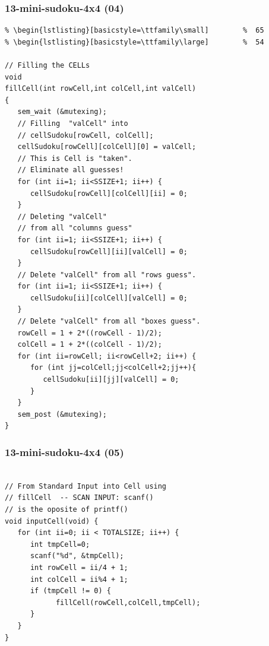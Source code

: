 \documentclass[xcolor=table, notheorems, hyperref={pdfpagelabels=false}]{beamer}
\begin{document}
\begin{frame}[fragile]
\frametitle{13-mini-sudoku-4x4 (04)}
\begin{lstlisting}[basicstyle=\ttfamily\tiny]         % 108
% \begin{lstlisting}[basicstyle=\ttfamily\footnotesize] %  72
% \begin{lstlisting}[basicstyle=\ttfamily\small]        %  65
% \begin{lstlisting}[basicstyle=\ttfamily\large]        %  54

// Filling the CELLs
void
fillCell(int rowCell,int colCell,int valCell)
{
   sem_wait (&mutexing);
   // Filling  "valCell" into 
   // cellSudoku[rowCell, colCell];
   cellSudoku[rowCell][colCell][0] = valCell;
   // This is Cell is "taken". 
   // Eliminate all guesses!
   for (int ii=1; ii<SSIZE+1; ii++) {
      cellSudoku[rowCell][colCell][ii] = 0;
   }
   // Deleting "valCell" 
   // from all "columns guess"
   for (int ii=1; ii<SSIZE+1; ii++) {
      cellSudoku[rowCell][ii][valCell] = 0;
   }
   // Delete "valCell" from all "rows guess".
   for (int ii=1; ii<SSIZE+1; ii++) {
      cellSudoku[ii][colCell][valCell] = 0;
   }
   // Delete "valCell" from all "boxes guess".
   rowCell = 1 + 2*((rowCell - 1)/2);
   colCell = 1 + 2*((colCell - 1)/2);
   for (int ii=rowCell; ii<rowCell+2; ii++) {
      for (int jj=colCell;jj<colCell+2;jj++){
         cellSudoku[ii][jj][valCell] = 0;
      }
   }
   sem_post (&mutexing);
}

\end{lstlisting}
\end{frame}

\begin{frame}[fragile]
\frametitle{13-mini-sudoku-4x4 (05)}
\begin{lstlisting}[basicstyle=\ttfamily\large]        %  54

// From Standard Input into Cell using 
// fillCell  -- SCAN INPUT: scanf() 
// is the oposite of printf()
void inputCell(void) {
   for (int ii=0; ii < TOTALSIZE; ii++) {
      int tmpCell=0;
      scanf("%d", &tmpCell);
      int rowCell = ii/4 + 1;
      int colCell = ii%4 + 1;
      if (tmpCell != 0) {
            fillCell(rowCell,colCell,tmpCell);
      }
   }
}

\end{lstlisting}
\end{frame}
\end{document}
